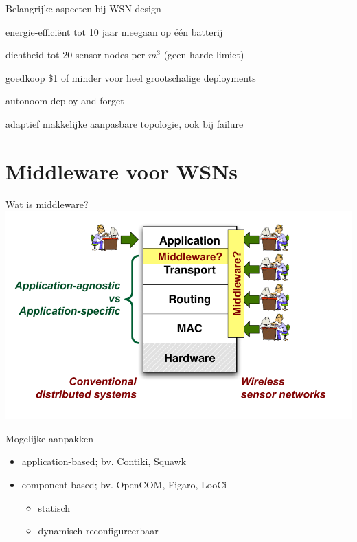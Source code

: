 \documentclass[presentation, bigger]{beamer}
\begin{document}
\begin{frame}[label=sec-1-6]{Belangrijke aspecten bij WSN-design}
\begin{block}{energie-effici\"ent}
tot 10 jaar meegaan op \'e\'en batterij
\end{block}%
\begin{block}{dichtheid}
tot 20 sensor nodes per $m^3$ (geen harde limiet)
\end{block}%
\begin{block}{goedkoop}
\$1 of minder voor heel grootschalige deployments
\end{block}%
\begin{block}{autonoom}
deploy and forget
\end{block}%
\begin{block}{adaptief}
makkelijke aanpasbare topologie, ook bij failure
\end{block}
\end{frame}

\section{Middleware voor WSNs}
\label{sec-2}
\begin{frame}[label=sec-2-1]{Wat is middleware?}
\includegraphics[width=\textwidth,keepaspectration=true]{middleware}
\end{frame}

\begin{frame}[label=sec-2-2]{Mogelijke aanpakken}
\begin{itemize}
\item application-based; bv. Contiki, Squawk
\item component-based; bv. OpenCOM, Figaro, LooCi
\begin{itemize}
\item statisch
\item dynamisch reconfigureerbaar
\end{itemize}
\end{itemize}
\end{frame}
\end{document}
